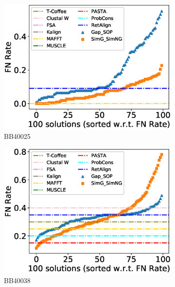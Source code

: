 \begin{figure}[!htbp]
\begin{adjustwidth}{-1.5cm}{-1cm}
		\begin{subfigure}{0.22\textwidth}
			\includegraphics[width=\columnwidth]{Figure/summary/precomputedInit/Balibase/BB40025_fnrate_density_single_run}
			\caption{BB40025}
		\end{subfigure}
		\begin{subfigure}{0.22\textwidth}
			\includegraphics[width=\columnwidth]{Figure/summary/precomputedInit/Balibase/BB40038_fnrate_density_single_run}
			\caption{BB40038}
		\end{subfigure}
		\begin{subfigure}{0.22\textwidth}

\end{subfigure}
\end{adjustwidth}
\end{figure}
